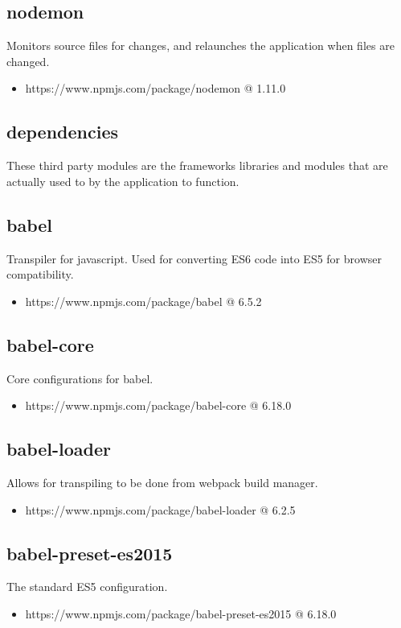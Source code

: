   \subsection{nodemon}
  Monitors source files for changes, and relaunches the application when files are changed.
  \begin{itemize}
    \item https://www.npmjs.com/package/nodemon @ 1.11.0
  \end{itemize}

\subsection{dependencies}
  These third party modules are the frameworks libraries and modules that are actually used to by the application to function. 

  \subsection{babel}
  Transpiler for javascript. Used for converting ES6 code into ES5 for browser compatibility.
  \begin{itemize}
    \item https://www.npmjs.com/package/babel @ 6.5.2
  \end{itemize}

  \subsection{babel-core}
  Core configurations for babel.
  \begin{itemize}
    \item https://www.npmjs.com/package/babel-core @ 6.18.0
  \end{itemize}

  \subsection{babel-loader}
  Allows for transpiling to be done from webpack build manager.
  \begin{itemize}
    \item https://www.npmjs.com/package/babel-loader @ 6.2.5
  \end{itemize}

  \subsection{babel-preset-es2015}
  The standard ES5 configuration.
  \begin{itemize}
    \item https://www.npmjs.com/package/babel-preset-es2015 @ 6.18.0
  \end{itemize}

